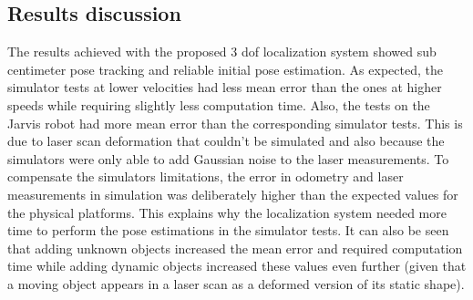 \subsection{Results discussion}

The results achieved with the proposed 3 \gls{dof} localization system showed sub centimeter pose tracking and reliable initial pose estimation. As expected, the simulator tests at lower velocities had less mean error than the ones at higher speeds while requiring slightly less computation time. Also, the tests on the Jarvis robot had more mean error than the corresponding simulator tests. This is due to laser scan deformation that couldn't be simulated and also because the simulators were only able to add Gaussian noise to the laser measurements. To compensate the simulators limitations, the error in odometry and laser measurements in simulation was deliberately higher than the expected values for the physical platforms. This explains why the localization system needed more time to perform the pose estimations in the simulator tests. It can also be seen that adding unknown objects increased the mean error and required computation time while adding dynamic objects increased these values even further (given that a moving object appears in a laser scan as a deformed version of its static shape).

